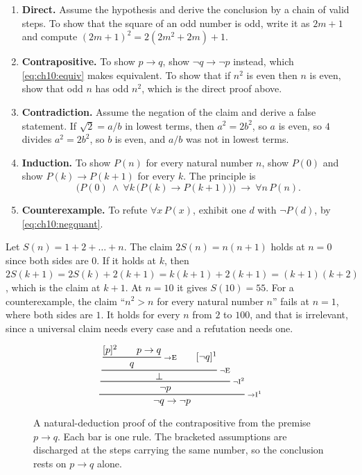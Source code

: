 \begin{enumerate}[leftmargin=*]
\item \textbf{Direct.} Assume the hypothesis and derive the conclusion by a chain of valid steps. To show that the square of an odd number is odd, write it as $2m+1$ and compute $(2m+1)^2=2(2m^2+2m)+1$.
\item \textbf{Contrapositive.} To show $p\to q$, show $\neg q\to\neg p$ instead, which \eqref{eq:ch10:equiv} makes equivalent. To show that if $n^2$ is even then $n$ is even, show that odd $n$ has odd $n^2$, which is the direct proof above.
\item \textbf{Contradiction.} Assume the negation of the claim and derive a false statement. If $\sqrt2=a/b$ in lowest terms, then $a^2=2b^2$, so $a$ is even, so $4$ divides $a^2=2b^2$, so $b$ is even, and $a/b$ was not in lowest terms.
\item \textbf{Induction.} To show $P(n)$ for every natural number $n$, show $P(0)$ and show $P(k)\to P(k+1)$ for every $k$. The principle is
\begin{equation}
\Big(P(0)\ \wedge\ \forall k\,\big(P(k)\to P(k+1)\big)\Big)\ \to\ \forall n\,P(n).
\label{eq:ch10:induction}
\end{equation}
\item \textbf{Counterexample.} To refute $\forall x\,P(x)$, exhibit one $d$ with $\neg P(d)$, by \eqref{eq:ch10:negquant}.
\end{enumerate}

\begin{example}\label{ex:ch10:induction}
Let $S(n)=1+2+\dots+n$. The claim $2S(n)=n(n+1)$ holds at $n=0$ since both sides are $0$. If it holds at $k$, then $2S(k+1)=2S(k)+2(k+1)=k(k+1)+2(k+1)=(k+1)(k+2)$, which is the claim at $k+1$. At $n=10$ it gives $S(10)=55$. For a counterexample, the claim ``$n^2>n$ for every natural number $n$'' fails at $n=1$, where both sides are $1$. It holds for every $n$ from $2$ to $100$, and that is irrelevant, since a universal claim needs every case and a refutation needs one.
\end{example}

\providecommand{\ompinfer}[3]{\genfrac{}{}{0.6pt}{0}{#2}{#3}\,{\scriptstyle #1}}
\begin{figure}[tbp]
\centering
\[
\ompinfer{{\to}\mathrm{I}^{1}}{\ompinfer{\neg\mathrm{I}^{2}}{\ompinfer{\neg\mathrm{E}}{\ompinfer{{\to}\mathrm{E}}{[p]^{2}\qquad p\to q}{q}\qquad [\neg q]^{1}}{\bot}}{\neg p}}{\neg q\to\neg p}
\]
\caption{A natural-deduction proof of the contrapositive from the premise $p\to q$. Each bar is one rule. The bracketed assumptions are discharged at the steps carrying the same number, so the conclusion rests on $p\to q$ alone.}
\label{fig:ch10:tree}
\end{figure}

